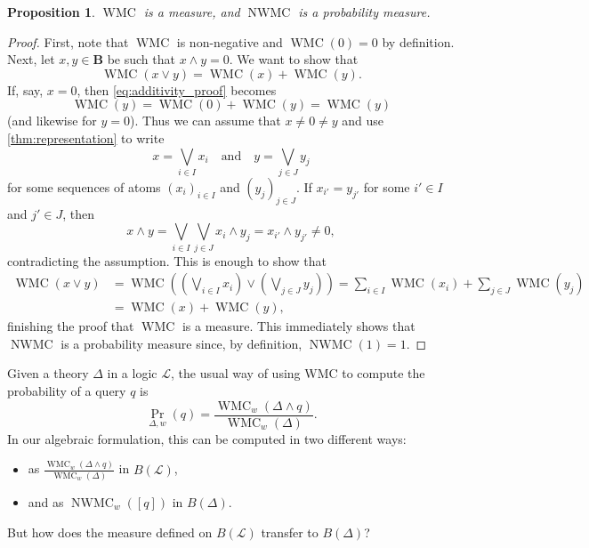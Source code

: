 \documentclass{article}
\newtheorem{proposition}{Proposition}
\theoremstyle{definition}
\theoremstyle{remark}
\DeclareMathOperator{\WMC}{WMC}
\DeclareMathOperator{\nWMC}{NWMC}
\begin{document}
\begin{proposition}
  $\WMC$ is a measure, and $\nWMC$ is a probability measure.
\end{proposition}
\begin{proof}
  First, note that $\WMC$ is non-negative and $\WMC(0) = 0$ by definition. Next,
  let $x, y \in \mathbf{B}$ be such that $x \land y = 0$. We want to show that
  \begin{equation} \label{eq:additivity_proof}
    \WMC(x \lor y) = \WMC(x) + \WMC(y).
  \end{equation}
  If, say, $x = 0$, then \cref{eq:additivity_proof} becomes
  \[
    \WMC(y) = \WMC(0) + \WMC(y) = \WMC(y)
  \]
  (and likewise for $y = 0$). Thus we can assume that $x \ne 0 \ne y$ and use
  \cref{thm:representation} to write
  \[
    x = \bigvee_{i \in I} x_i \quad \text{and} \quad y = \bigvee_{j \in J} y_j
  \]
  for some sequences of atoms $(x_i)_{i \in I}$ and $(y_j)_{j \in J}$. If
  $x_{i'} = y_{j'}$ for some $i' \in I$ and $j' \in J$, then
  \[
    x \land y = \bigvee_{i \in I} \bigvee_{j \in J} x_i \land y_j = x_{i'} \land
    y_{j'} \ne 0,
  \]
  contradicting the assumption. This is enough to show that
  \begin{align*}
    \WMC(x \lor y) &= \WMC\left( \left( \bigvee_{i \in I} x_i \right) \lor \left(\bigvee_{j \in J} y_j \right) \right) = \sum_{i \in I} \WMC(x_i) + \sum_{j \in J} \WMC(y_j) \\
                   &= \WMC(x) + \WMC(y),
  \end{align*}
  finishing the proof that $\WMC$ is a measure. This immediately shows that
  $\nWMC$ is a probability measure since, by definition, $\nWMC(1) = 1$.
\end{proof}

Given a theory $\Delta$ in a logic $\mathcal{L}$, the usual way of using WMC to
compute the probability of a query $q$ is
\cite{DBLP:conf/uai/Belle17,DBLP:conf/aaai/SangBK05}
\[
  \Pr_{\Delta, w}(q) = \frac{\WMC_w(\Delta \land q)}{\WMC_w(\Delta)}.
\]
In our algebraic formulation, this can be computed in two different ways:
\begin{itemize}
\item as $\frac{\WMC_w(\Delta \land q)}{\WMC_w(\Delta)}$ in $B(\mathcal{L})$,
\item and as $\nWMC_w([q])$ in $B(\Delta)$.
\end{itemize}
But how does the measure defined on $B(\mathcal{L})$ transfer to $B(\Delta)$?
\end{document}
